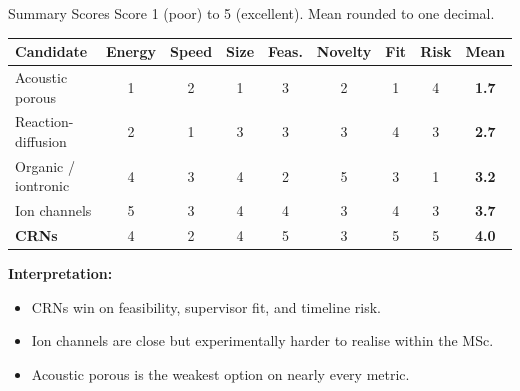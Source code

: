\documentclass[aspectratio=169,11pt]{beamer}
\begin{document}
\begin{frame}{Summary Scores}
  \small
  Score 1 (poor) to 5 (excellent). Mean rounded to one decimal.
  \begin{center}
    \footnotesize
    \begin{tabular}{lcccccccc}
      \toprule
      Candidate & Energy & Speed & Size & Feas. & Novelty & Fit & Risk & \textbf{Mean} \\
      \midrule
      Acoustic porous & 1 & 2 & 1 & 3 & 2 & 1 & 4 & \textbf{1.7} \\
      Reaction-diffusion & 2 & 1 & 3 & 3 & 3 & 4 & 3 & \textbf{2.7} \\
      Organic / iontronic & 4 & 3 & 4 & 2 & 5 & 3 & 1 & \textbf{3.2} \\
      Ion channels & 5 & 3 & 4 & 4 & 3 & 4 & 3 & \textbf{3.7} \\
      \textbf{CRNs} & 4 & 2 & 4 & 5 & 3 & 5 & 5 & \textbf{4.0} \\
      \bottomrule
    \end{tabular}
  \end{center}

  \vspace{0.15cm}
  \textbf{Interpretation:}
  \begin{itemize}
    \item CRNs win on feasibility, supervisor fit, and timeline risk.
    \item Ion channels are close but experimentally harder to realise within the MSc.
    \item Acoustic porous is the weakest option on nearly every metric.
  \end{itemize}
\end{frame}
\end{document}
